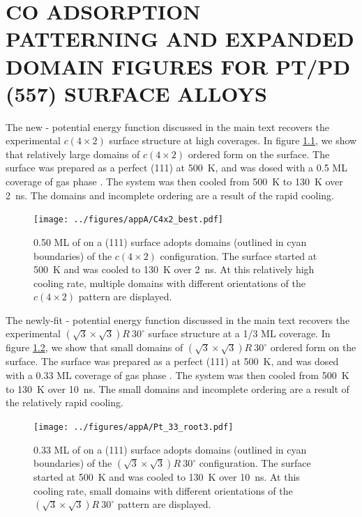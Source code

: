 
\chapter{CO ADSORPTION PATTERNING AND EXPANDED DOMAIN FIGURES FOR PT/PD (557) SURFACE ALLOYS}
\label{app:SI}

The new - potential energy function discussed in the
main text recovers the experimental $c(4 \times 2)$ surface structure
at high coverages.  In figure \ref{fig:C4x2}, we show that relatively
large domains of $c(4 \times 2)$ ordered  form on the surface.
The surface was prepared as a perfect (111) at 500~K, and was
dosed with a 0.5 ML coverage of gas phase .  The system was
then cooled from 500~K to 130~K over 2~ns.  The domains and incomplete
ordering are a result of the rapid cooling.

\begin{figure}
  \texttt{[image: ../figures/appA/C4x2\_best.pdf]}
  \caption{0.50 ML of  on a (111) surface adopts domains
    (outlined in cyan boundaries) of the $c(4 \times 2)$
    configuration. The surface started at 500~K and was cooled to
    130~K over 2~ns.  At this relatively high cooling rate, multiple
    domains with different orientations of the $c(4 \times 2)$ pattern
    are displayed.}
\label{fig:C4x2}
\end{figure}

\newpage

The newly-fit - potential energy function discussed in
the main text recovers the experimental
$(\sqrt{3} \times \sqrt{3}) R~30^{\circ}$ surface structure at a 1/3
ML coverage.  In figure \ref{fig:Root3}, we show that small domains of
$(\sqrt{3} \times \sqrt{3}) R~30^{\circ}$ ordered  form on the
surface.  The surface was prepared as a perfect (111) at 500~K,
and was dosed with a 0.33 ML coverage of gas phase .  The
system was then cooled from 500~K to 130~K over 10~ns.  The small
domains and incomplete ordering are a result of the relatively rapid
cooling.

\begin{figure}
  \texttt{[image: ../figures/appA/Pt\_33\_root3.pdf]}
  \caption{0.33 ML of  on a (111) surface adopts domains
    (outlined in cyan boundaries) of the
    $(\sqrt{3} \times \sqrt{3}) R~30^{\circ}$ configuration. The
    surface started at 500~K and was cooled to 130~K over 10~ns.  At
    this cooling rate, small domains with different orientations of
    the $(\sqrt{3} \times \sqrt{3}) R~30^{\circ}$ pattern are
    displayed.}
\label{fig:Root3}
\end{figure}

